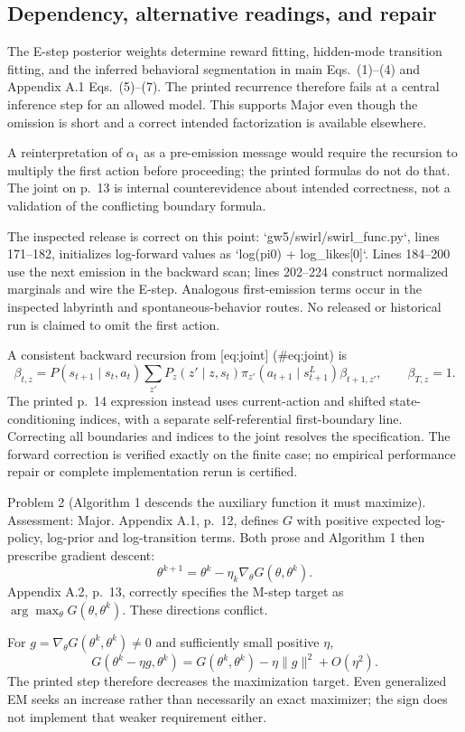\documentclass[10pt]{article}
\begin{document}
\subsection*{Dependency, alternative readings, and repair}
The E-step posterior weights determine reward fitting, hidden-mode transition fitting, and the inferred behavioral segmentation in main Eqs. (1)–(4) and Appendix A.1 Eqs. (5)–(7). The printed recurrence therefore fails at a central inference step for an allowed model. This supports Major even though the omission is short and a correct intended factorization is available elsewhere.\par
A reinterpretation of \(\alpha_1\) as a pre-emission message would require the recursion to multiply the first action before proceeding; the printed formulas do not do that. The joint on p. 13 is internal counterevidence about intended correctness, not a validation of the conflicting boundary formula.\par
The inspected release is correct on this point: `gw5/swirl/swirl\_func.py`, lines 171–182, initializes log-forward values as `log(pi0) + log\_likes[0]`. Lines 184–200 use the next emission in the backward scan; lines 202–224 construct normalized marginals and wire the E-step. Analogous first-emission terms occur in the inspected labyrinth and spontaneous-behavior routes. No released or historical run is claimed to omit the first action.\par
A consistent backward recursion from [eq:joint] (\#eq:joint) is \[\beta_{t,z}
=P(s_{t+1}\mid s_t,a_t)
 \sum_{z'}P_z(z'\mid z,s_t)
 \pi_{z'}(a_{t+1}\mid s_{t+1}^L)\beta_{t+1,z'},
\qquad \beta_{T,z}=1.\] The printed p. 14 expression instead uses current-action and shifted state-conditioning indices, with a separate self-referential first-boundary line. Correcting all boundaries and indices to the joint resolves the specification. The forward correction is verified exactly on the finite case; no empirical performance repair or complete implementation rerun is certified.\par
Problem 2 (Algorithm 1 descends the auxiliary function it must maximize).  Assessment: Major. Appendix A.1, p. 12, defines \(G\) with positive expected log-policy, log-prior and log-transition terms. Both prose and Algorithm 1 then prescribe gradient descent: \[\theta^{k+1}=\theta^k-\eta_k\nabla_\theta G(\theta,\theta^k).\] Appendix A.2, p. 13, correctly specifies the M-step target as \(\arg\max_\theta G(\theta,\theta^k)\). These directions conflict.\par
For \(g=\nabla_\theta G(\theta^k,\theta^k)\ne0\) and sufficiently small positive \(\eta\), \[G(\theta^k-\eta g,\theta^k)
=G(\theta^k,\theta^k)-\eta\|g\|^2+O(\eta^2).\] The printed step therefore decreases the maximization target. Even generalized EM seeks an increase rather than necessarily an exact maximizer; the sign does not implement that weaker requirement either.\par
\end{document}

